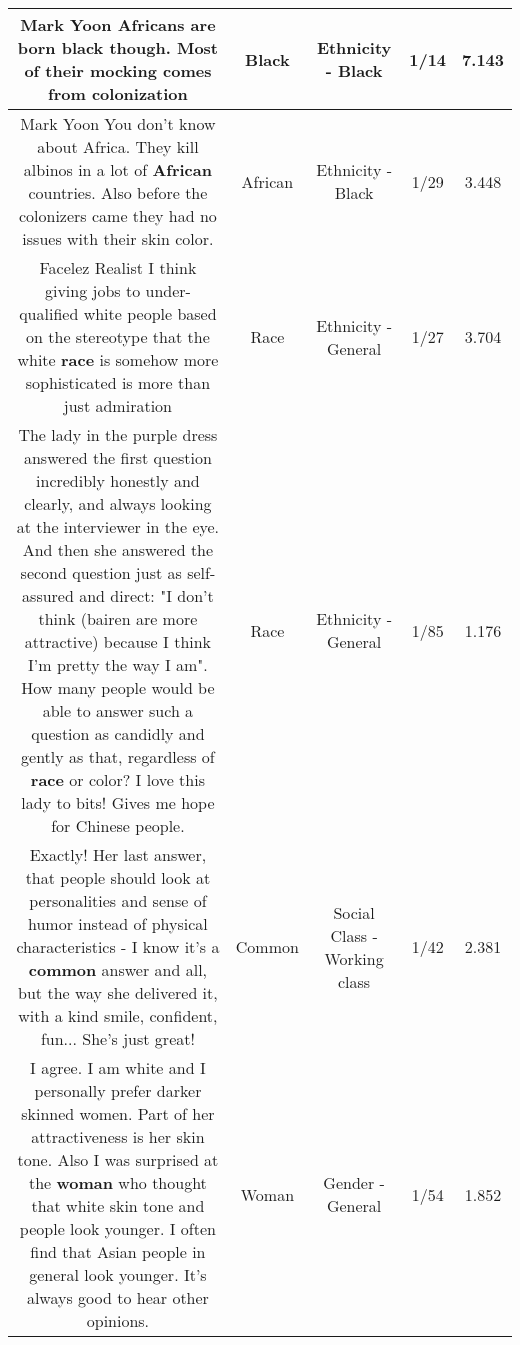 \documentclass[11pt]{article}
\newlength\mylength
\begin{document}
\begin{center}
\begin{longtable}{|C{.65\mylength}|C{.30\mylength}|C{.12\mylength}|C{.12\mylength}|C{.12\mylength}|}
  \small Mark Yoon Africans are born \textbf{black} though. Most of their mocking comes from colonization\normalsize   & Black & Ethnicity - Black & 1/14 & 7.143 \\  \hline
  \small Mark Yoon You don't know about Africa. They kill albinos in a lot of \textbf{African} countries. Also before the colonizers came they had no issues with their skin color.\normalsize   & African & Ethnicity - Black & 1/29 & 3.448 \\  \hline
  \small Facelez Realist I think giving jobs to under-qualified white people based on the stereotype that the white \textbf{race} is somehow more sophisticated is more than just admiration\normalsize   & Race & Ethnicity - General & 1/27 & 3.704 \\  \hline
  \small The lady in the purple dress answered the first question incredibly honestly and clearly, and always looking at the interviewer in the eye. And then she answered the second question just as self-assured and direct: "I don't think (bairen are more attractive) because I think I'm pretty the way I am". How many people would be able to answer such a question as candidly and gently as that, regardless of \textbf{race} or color? I love this lady to bits! Gives me hope for Chinese people.\normalsize   & Race & Ethnicity - General & 1/85 & 1.176 \\  \hline
  \small Exactly! Her last answer, that people should look at personalities and sense of humor instead of physical characteristics - I know it's a \textbf{common} answer and all, but the way she delivered it, with a kind smile, confident, fun... She's just great!\normalsize   & Common & Social Class - Working class & 1/42 & 2.381 \\  \hline
  \small I agree.  I am white and I personally prefer darker skinned women.  Part of her attractiveness is her skin tone.  Also I was surprised at the \textbf{woman} who thought that white skin tone and people look younger.  I often find that Asian people in general look younger.  It's always good to hear other opinions.\normalsize   & Woman & Gender - General & 1/54 & 1.852 \\  \hline

\end{longtable}
\end{center}
\end{document}
